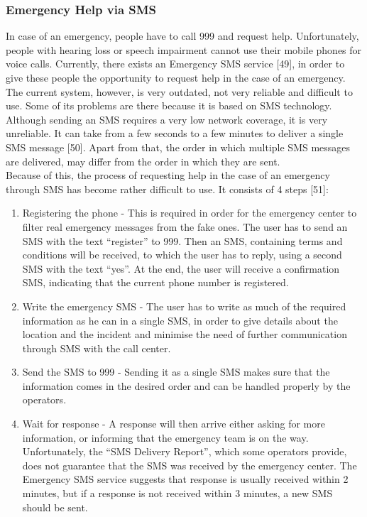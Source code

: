 \documentclass{article}
\begin{document}
\subsubsection{Emergency Help via SMS}
In case of an emergency, people have to call 999 and request help. Unfortunately, people with hearing loss or speech impairment cannot use their mobile phones for voice calls. Currently, there exists an Emergency SMS service [49], in order to give these people the opportunity to request help in the case of an emergency.\\

The current system, however, is very outdated, not very reliable and difficult to use. Some of its problems are there because it is based on SMS technology. Although sending an SMS requires a very low network coverage, it is very unreliable. It can take from a few seconds to a few minutes to deliver a single SMS message [50]. Apart from that, the order in which multiple SMS messages are delivered, may differ from the order in which they are sent. \\

Because of this, the process of requesting help in the case of an emergency through SMS has become rather difficult to use. It consists of 4 steps [51]:
\begin{enumerate}
\item Registering the phone - This is required in order for the emergency center to filter real emergency messages from the fake ones. The user has to send an SMS with the text ``register'' to 999. Then an SMS, containing terms and conditions will be received, to which the user has to reply, using a second SMS with the text ``yes''. At the end, the user will receive a confirmation SMS, indicating that the current phone number is registered.
\item Write the emergency SMS - The user has to write as much of the required information as he can in a single SMS, in order to give details about the location and the incident and minimise the need of further communication through SMS with the call center.
\item Send the SMS to 999 - Sending it as a single SMS makes sure that the information comes in the desired order and can be handled properly by the operators.
\item Wait for response - A response will then arrive either asking for more information, or informing that the emergency team is on the way. Unfortunately, the ``SMS Delivery Report'', which some operators provide, does not guarantee that the SMS was received by the emergency center. The Emergency SMS service suggests that response is usually received within 2 minutes, but if a response is not received within 3 minutes, a new SMS should be sent.
\end{enumerate}
\end{document}
